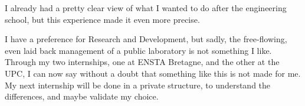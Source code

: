 I already had a pretty clear view of what I wanted to do after the engineering school, but this experience made it even more precise.

I have a preference for Research and Development, but sadly, the free-flowing, even laid back management of a public laboratory is not something I like.
Through my two internships, one at ENSTA Bretagne, and the other at the UPC, I can now say without a doubt that something like this is not made for me.\\

My next internship will be done in a private structure, to understand the differences, and maybe validate my choice.

